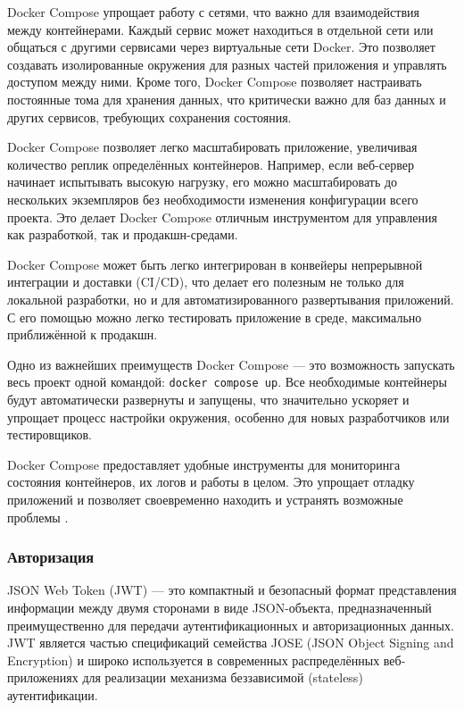 \documentclass[diploma]{SCWorks}
\begin{document}
Docker Compose упрощает работу с сетями, что важно для взаимодействия между 
контейнерами. Каждый сервис может находиться в отдельной сети или общаться с 
другими сервисами через виртуальные сети Docker. Это позволяет создавать 
изолированные окружения для разных частей приложения и управлять доступом 
между ними. Кроме того, Docker Compose позволяет настраивать постоянные тома 
для хранения данных, что критически важно для баз данных и других сервисов, 
требующих сохранения состояния.
    
Docker Compose позволяет легко масштабировать приложение, увеличивая 
количество реплик определённых контейнеров. Например, если веб-сервер начинает 
испытывать высокую нагрузку, его можно масштабировать до нескольких экземпляров 
без необходимости изменения конфигурации всего проекта. Это делает 
Docker Compose отличным инструментом для управления как разработкой, так и 
продакшн-средами.
    
Docker Compose может быть легко интегрирован в конвейеры непрерывной 
интеграции и доставки (CI/CD), что делает его полезным не только для 
локальной разработки, но и для автоматизированного развертывания приложений. 
С его помощью можно легко тестировать приложение в среде, максимально 
приближённой к продакшн.
    
Одно из важнейших преимуществ Docker Compose — это возможность запускать весь 
проект одной командой: \texttt{docker compose up}. Все необходимые контейнеры 
будут автоматически развернуты и запущены, что значительно ускоряет и упрощает 
процесс настройки окружения, особенно для новых разработчиков или тестировщиков.
    
Docker Compose предоставляет удобные инструменты для мониторинга состояния 
контейнеров, их логов и работы в целом. Это упрощает отладку приложений и 
позволяет своевременно находить и устранять возможные проблемы \cite{docker}.

\subsubsection{Авторизация}

JSON Web Token (JWT) — это компактный и безопасный формат представления 
информации между двумя сторонами в виде JSON-объекта, предназначенный 
преимущественно для передачи аутентификационных и авторизационных данных. 
JWT является частью спецификаций семейства JOSE (JSON Object Signing and 
Encryption) и широко используется в современных распределённых веб-приложениях 
для реализации механизма беззависимой (stateless) аутентификации.
\end{document}
